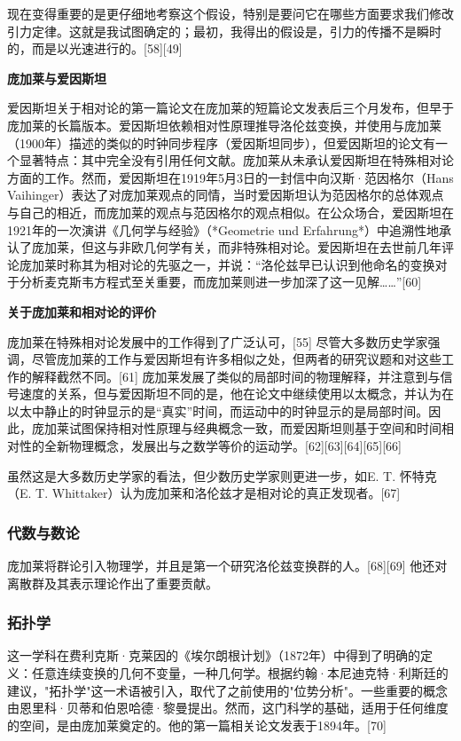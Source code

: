 现在变得重要的是更仔细地考察这个假设，特别是要问它在哪些方面要求我们修改引力定律。这就是我试图确定的；最初，我得出的假设是，引力的传播不是瞬时的，而是以光速进行的。[58][49]

\textbf{庞加莱与爱因斯坦}

爱因斯坦关于相对论的第一篇论文在庞加莱的短篇论文发表后三个月发布，但早于庞加莱的长篇版本。爱因斯坦依赖相对性原理推导洛伦兹变换，并使用与庞加莱（1900年）描述的类似的时钟同步程序（爱因斯坦同步），但爱因斯坦的论文有一个显著特点：其中完全没有引用任何文献。庞加莱从未承认爱因斯坦在特殊相对论方面的工作。然而，爱因斯坦在1919年5月3日的一封信中向汉斯·范因格尔（Hans Vaihinger）表达了对庞加莱观点的同情，当时爱因斯坦认为范因格尔的总体观点与自己的相近，而庞加莱的观点与范因格尔的观点相似。在公众场合，爱因斯坦在1921年的一次演讲《几何学与经验》（*Geometrie und Erfahrung*）中追溯性地承认了庞加莱，但这与非欧几何学有关，而非特殊相对论。爱因斯坦在去世前几年评论庞加莱时称其为相对论的先驱之一，并说：“洛伦兹早已认识到他命名的变换对于分析麦克斯韦方程式至关重要，而庞加莱则进一步加深了这一见解……”[60]

\textbf{关于庞加莱和相对论的评价} 

庞加莱在特殊相对论发展中的工作得到了广泛认可，[55] 尽管大多数历史学家强调，尽管庞加莱的工作与爱因斯坦有许多相似之处，但两者的研究议题和对这些工作的解释截然不同。[61] 庞加莱发展了类似的局部时间的物理解释，并注意到与信号速度的关系，但与爱因斯坦不同的是，他在论文中继续使用以太概念，并认为在以太中静止的时钟显示的是“真实”时间，而运动中的时钟显示的是局部时间。因此，庞加莱试图保持相对性原理与经典概念一致，而爱因斯坦则基于空间和时间相对性的全新物理概念，发展出与之数学等价的运动学。[62][63][64][65][66]

虽然这是大多数历史学家的看法，但少数历史学家则更进一步，如E. T. 怀特克（E. T. Whittaker）认为庞加莱和洛伦兹才是相对论的真正发现者。[67]
\subsubsection{代数与数论}
庞加莱将群论引入物理学，并且是第一个研究洛伦兹变换群的人。[68][69] 他还对离散群及其表示理论作出了重要贡献。
\subsubsection{拓扑学}
这一学科在费利克斯·克莱因的《埃尔朗根计划》（1872年）中得到了明确的定义：任意连续变换的几何不变量，一种几何学。根据约翰·本尼迪克特·利斯廷的建议，"拓扑学"这一术语被引入，取代了之前使用的"位势分析"。一些重要的概念由恩里科·贝蒂和伯恩哈德·黎曼提出。然而，这门科学的基础，适用于任何维度的空间，是由庞加莱奠定的。他的第一篇相关论文发表于1894年。[70]


